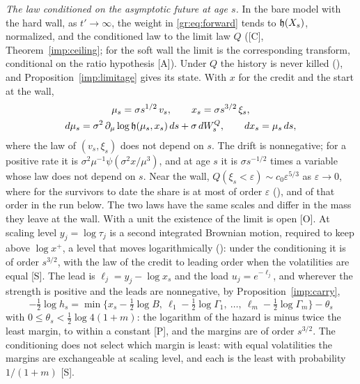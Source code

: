 \emph{The law conditioned on the asymptotic future at age $s$.} In the bare model with the hard wall, as
$t'\to\infty$, the weight in \eqref{gr:eq:forward} tends to $\mathfrak{h}(X_s)$,
normalized, and the conditioned law to the limit law $Q$ ([C], Theorem~\ref{imp:ceiling}; for
the soft wall the limit is the corresponding transform, conditional on
the ratio hypothesis [A]). Under $Q$ the history is never killed
(\cite{GoldenSurvivorship}), and Proposition~\ref{imp:limitage} gives its state. With $x$ for the credit and
the start at the wall,
\begin{equation}\label{gr:eq:limitstate}
\begin{gathered}
\mu_s=\sigma s^{1/2}\,v_s,\qquad x_s=\sigma s^{3/2}\,\xi_s,\\
d\mu_s=\sigma^2\,\partial_\mu\log\mathfrak{h}(\mu_s,x_s)\,ds+\sigma\,dW^Q_s,\qquad dx_s=\mu_s\,ds,
\end{gathered}
\end{equation}
where the law of $(v_s,\xi_s)$ does not depend on $s$. The drift is
nonnegative; for a positive rate it is
$\sigma^2\mu^{-1}\psi(\sigma^2x/\mu^3)$, and at age $s$ it is
$\sigma s^{-1/2}$ times a variable whose law does not depend on $s$.
Near the wall,
$Q(\xi_s<\varepsilon)\sim c_0\varepsilon^{5/3}$ as $\varepsilon\to0$,
where for the survivors to date the share is at most of order
$\varepsilon$ (\cite{GoldenSurvivorship}), and of that order in the run below. The two
laws have the same scales and differ in the mass they leave at the wall. With a unit the existence of
the limit is open [O]. At scaling level $y_j=\log\tau_j$ is a second
integrated Brownian motion, required to keep above $\log x^+$, a level
that moves logarithmically (\cite{GoldenSurvivorship}): under the conditioning it is of
order $s^{3/2}$, with the law of the credit to leading order when the
volatilities are equal [S]. The lead is $\ell_j=y_j-\log x_s$ and the
load $u_j=e^{-\ell_j}$, and wherever the strength is positive and the
leads are nonnegative, by Proposition~\ref{imp:carry},
\begin{equation}\label{gr:eq:limithazard}
-\tfrac12\log h_s=\min\bigl\{x_s-\tfrac12\log B,\ \ell_1-\tfrac12\log\Gamma_1,\ \dots,\ \ell_m-\tfrac12\log\Gamma_m\bigr\}-\theta_s
\end{equation}
with $0\le\theta_s<\tfrac12\log4(1+m)$: the logarithm of the hazard is
minus twice the least margin, to within a constant [P], and the margins
are of order $s^{3/2}$. The conditioning does not select which margin is
least: with equal volatilities the margins are exchangeable at scaling
level, and each is the least with probability $1/(1+m)$ [S].

